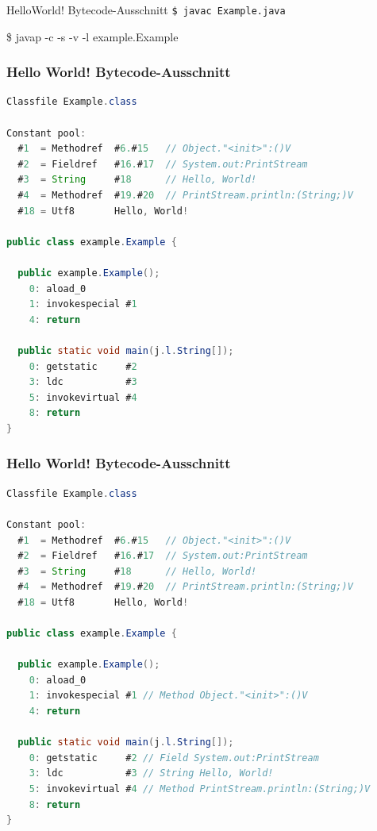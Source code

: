 \documentclass[10pt]{beamer}
\begin{document}

\begin{frame}{HelloWorld! Bytecode-Ausschnitt}
\tt{\$ javac Example.java}

{\btt\$ javap -c -s -v -l example.Example}
\end{frame}


\begin{frame}[fragile]
\frametitle{Hello World! Bytecode-Ausschnitt}
\begin{lstlisting}[language=Java]
Classfile Example.class

Constant pool:
  #1  = Methodref  #6.#15   // Object."<init>":()V
  #2  = Fieldref   #16.#17  // System.out:PrintStream
  #3  = String     #18      // Hello, World!
  #4  = Methodref  #19.#20  // PrintStream.println:(String;)V
  #18 = Utf8       Hello, World!

public class example.Example {

  public example.Example();
    0: aload_0       
    1: invokespecial #1
    4: return        

  public static void main(j.l.String[]);
    0: getstatic     #2
    3: ldc           #3
    5: invokevirtual #4
    8: return        
}
\end{lstlisting}
\end{frame}


\begin{frame}[fragile]
\frametitle{Hello World! Bytecode-Ausschnitt}
\begin{lstlisting}[language=Java]
Classfile Example.class

Constant pool:
  #1  = Methodref  #6.#15   // Object."<init>":()V
  #2  = Fieldref   #16.#17  // System.out:PrintStream
  #3  = String     #18      // Hello, World!
  #4  = Methodref  #19.#20  // PrintStream.println:(String;)V
  #18 = Utf8       Hello, World!

public class example.Example {

  public example.Example();
    0: aload_0       
    1: invokespecial #1 // Method Object."<init>":()V
    4: return        

  public static void main(j.l.String[]);
    0: getstatic     #2 // Field System.out:PrintStream
    3: ldc           #3 // String Hello, World!
    5: invokevirtual #4 // Method PrintStream.println:(String;)V
    8: return        
}
\end{lstlisting}
\end{frame}
\end{document}
